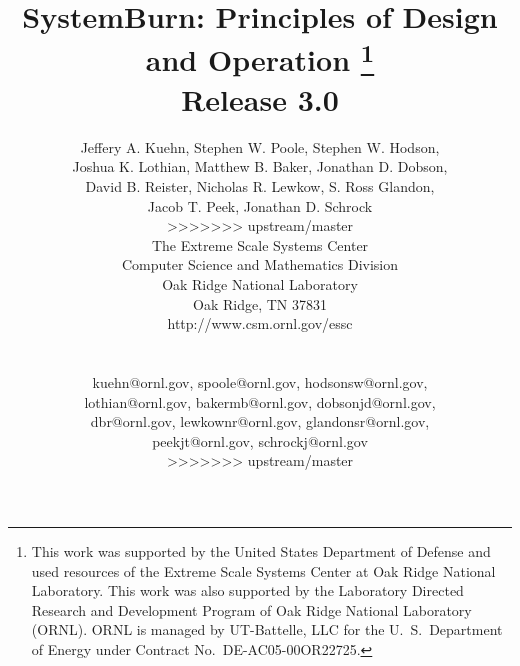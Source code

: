 \title{
	SystemBurn: Principles of Design and Operation
	\footnote{
		This work was supported by the United States Department of Defense and used resources of the
		Extreme Scale Systems Center at Oak Ridge National Laboratory.
		This work was also supported by the Laboratory Directed Research and
		Development Program of Oak Ridge National Laboratory (ORNL). ORNL is managed by UT-Battelle,
		LLC for the U.~S.~Department of Energy under Contract No.~DE-AC05-00OR22725.
	} \\
	Release 3.0\\
}

\author{
Jeffery A. Kuehn, Stephen W. Poole, Stephen W. Hodson,\\
Joshua K. Lothian, Matthew B. Baker, Jonathan D. Dobson, \\
David B. Reister, Nicholas R. Lewkow, S. Ross Glandon, \\
Jacob T. Peek, Jonathan D. Schrock \\
>>>>>>> upstream/master
\\
The Extreme Scale Systems Center \\
Computer Science and Mathematics Division \\
Oak Ridge National Laboratory \\
Oak Ridge, TN 37831 \\
http://www.csm.ornl.gov/essc\\
\\
\\
kuehn@ornl.gov, spoole@ornl.gov, hodsonsw@ornl.gov,\\
lothian@ornl.gov, bakermb@ornl.gov, dobsonjd@ornl.gov, \\
dbr@ornl.gov, lewkownr@ornl.gov, glandonsr@ornl.gov, \\
peekjt@ornl.gov, schrockj@ornl.gov\\
>>>>>>> upstream/master
}
\maketitle
